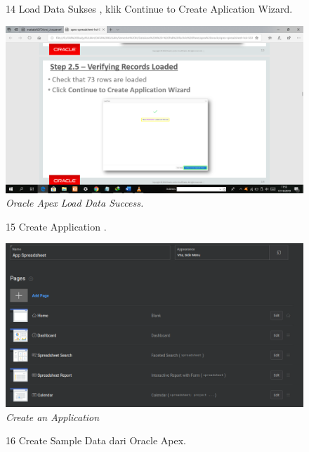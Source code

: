 \begin{enumerate}
\begin{figure}
\item[14] Load Data Sukses , klik Continue to Create Aplication Wizard.

    \begin{center}
\includegraphics[scale=0.2]{figures/pict(12).png}
    \caption{\textit{Oracle Apex Load Data Success.}}
        \end{center}
\label{gambar}
\end{figure}


\begin{figure}
\item[15]Create Application .

    \begin{center}
\includegraphics[scale=0.4]{figures/gambar5.png}
    \caption{\textit{Create an Application}}
        \end{center}
\label{gambar}
\end{figure}

\begin{figure}
\item[16]Create Sample Data dari Oracle Apex.


\end{figure}
\end{enumerate}

